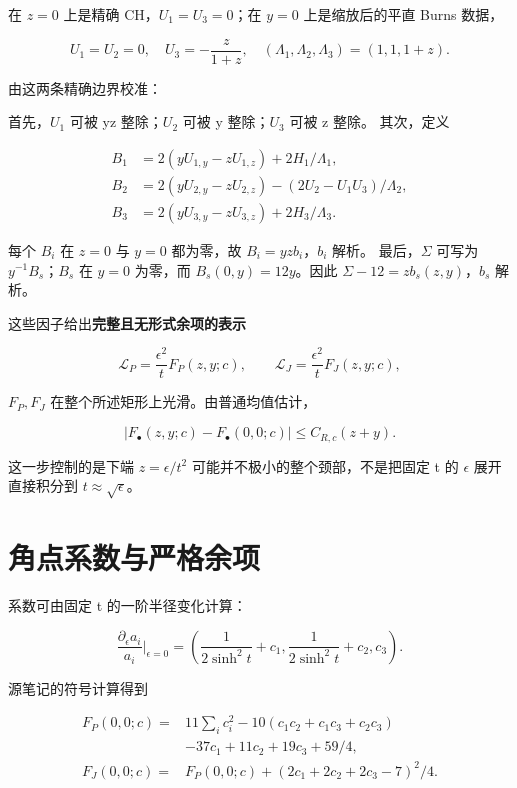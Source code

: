 \documentclass[UTF8,11pt,openany,fontset=none]{ctexbook}
\theoremstyle{definition}
\theoremstyle{remark}
\begin{document}
在 \(z=0\) 上是精确 CH，\(U_1=U_3=0\)；在 \(y=0\) 上是缩放后的平直 Burns 数据，

\[
 U_1=U_2=0,\quad U_3=-\frac z{1+z},\quad
 (\Lambda_1,\Lambda_2,\Lambda_3)=(1,1,1+z).
\]

由这两条精确边界校准：

首先，\(U_1\) 可被 yz 整除；\(U_2\) 可被 y 整除；\(U_3\) 可被 z 整除。 其次，定义

\[
\begin{aligned}
B_1&=2(yU_{1,y}-zU_{1,z})+2H_1/\Lambda_1,\\
B_2&=2(yU_{2,y}-zU_{2,z})-(2U_2-U_1U_3)/\Lambda_2,\\
B_3&=2(yU_{3,y}-zU_{3,z})+2H_3/\Lambda_3.
\end{aligned}
\]

每个 \(B_i\) 在 \(z=0\) 与 \(y=0\) 都为零，故 \(B_i=yz b_i\)，\(b_i\) 解析。 最后，\(\Sigma\) 可写为 \(y^{-1}B_s\)；\(B_s\) 在 \(y=0\) 为零，而 \(B_s(0,y)=12y\)。因此 \(\Sigma -12=z b_s(z,y)\)，\(b_s\) 解析。

这些因子给出\textbf{完整且无形式余项的表示}

\[
\boxed{\mathscr L_P=\frac{\epsilon^2}{t}F_P(z,y;c),\qquad
\mathscr L_J=\frac{\epsilon^2}{t}F_J(z,y;c),}
\tag{5.3.1}
\]

\(F_P,F_J\) 在整个所述矩形上光滑。由普通均值估计，

\[
 |F_\bullet(z,y;c)-F_\bullet(0,0;c)|\le C_{R,c}(z+y).
\tag{5.3.2}
\]

这一步控制的是下端 \(z=\epsilon /t^2\) 可能并不极小的整个颈部，不是把固定 t 的 \(\epsilon\) 展开直接积分到 \(t\approx \sqrt{\epsilon }\)。

\section{角点系数与严格余项}\label{v5-ux89d2ux70b9ux7cfbux6570ux4e0eux4e25ux683cux4f59ux9879}

系数可由固定 t 的一阶半径变化计算：

\[
\frac{\partial_\epsilon a_i}{a_i}\Big|_{\epsilon=0}
=\left(\frac1{2\sinh^2t}+c_1,
\frac1{2\sinh^2t}+c_2,c_3\right).
\]

源笔记的符号计算得到

\[
\begin{aligned}
F_P(0,0;c)={}&11\sum_i c_i^2
 -10(c_1c_2+c_1c_3+c_2c_3)\\
&-37c_1+11c_2+19c_3+59/4,\\
F_J(0,0;c)={}&F_P(0,0;c)+(2c_1+2c_2+2c_3-7)^2/4.
\end{aligned}
\]
\end{document}
